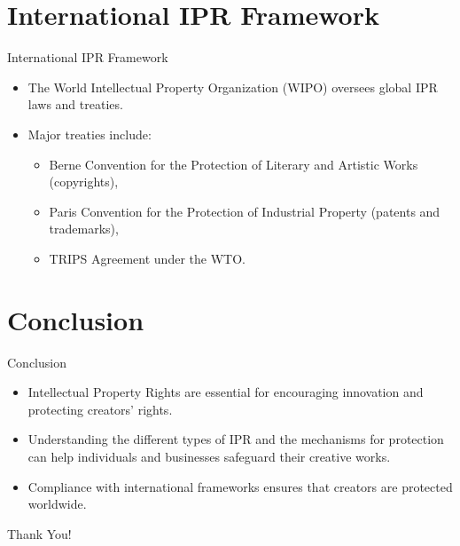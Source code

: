\documentclass{beamer}
\begin{document}
	\section{International IPR Framework}
	\begin{frame}{International IPR Framework}
		\begin{itemize}
			\item The World Intellectual Property Organization (WIPO) oversees global IPR laws and treaties.
			\item Major treaties include:
			\begin{itemize}
				\item Berne Convention for the Protection of Literary and Artistic Works (copyrights),
				\item Paris Convention for the Protection of Industrial Property (patents and trademarks),
				\item TRIPS Agreement under the WTO.
			\end{itemize}
		\end{itemize}
	\end{frame}
	
	\section{Conclusion}
	\begin{frame}{Conclusion}
		\begin{itemize}
			\item Intellectual Property Rights are essential for encouraging innovation and protecting creators' rights.
			\item Understanding the different types of IPR and the mechanisms for protection can help individuals and businesses safeguard their creative works.
			\item Compliance with international frameworks ensures that creators are protected worldwide.
		\end{itemize}
	\end{frame}
	
	\begin{frame}
		\begin{center}
			\Huge{Thank You!}
		\end{center}
	\end{frame}
	
\end{document}
